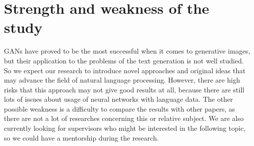 \documentclass[sigplan]{acmart}
\begin{document}


\section{Strength and weakness of the study}
GANs have proved to be the most successful when it comes to generative images, but their application to the problems of the text generation is not well studied. So we expect our research to introduce novel approaches and original ideas that may advance the field of natural language processing.
However, there are high risks that this approach may not give good results at all, because there are still lots of issues about  usage of neural networks with language data. The other possible weakness is a difficulty to compare the results with other papers, as there are not a lot of researches concerning this or relative subject. 
We are also currently looking for supervisors who might be interested in the following topic, so we could have a mentorship during the research.



\end{document}
